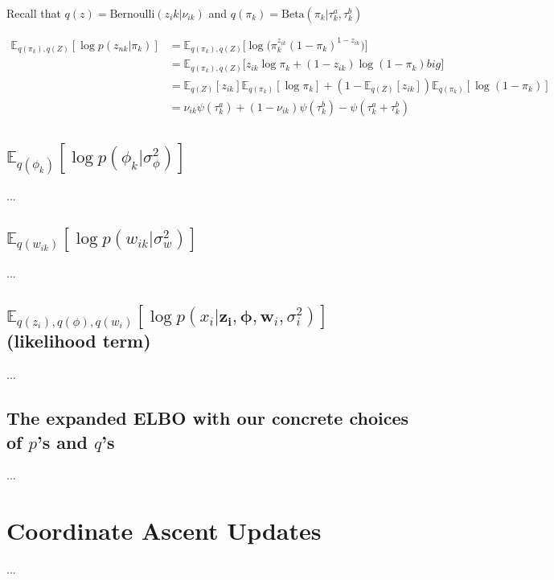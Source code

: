 \documentclass[11pt]{article}
\theoremstyle{definition}
\theoremstyle{plain}
\newcommand{\E}{\mathbb{E}}
\newcommand{\Beta}{\text{Beta}}
\newcommand{\Bernoulli}{\text{Bernoulli}}
\begin{document}
\noindent Recall that $q(z) = \Bernoulli(z_ik|\nu_{ik})$ and $q(\pi_k) = \Beta(\pi_k|\tau_k^a,\tau_k^b)$

\begin{align*}
    \E_{q(\pi_k),q(Z)}[\log p (z_{nk}|\pi_k)] 
        &= \E_{q(\pi_k),q(Z)}\big[\log \big(\pi_k^{z_{ik}}(1 - \pi_k)^{1 - z_{ik}}\big)\big]\\
        &= \E_{q(\pi_k),q(Z)}\big[ z_{ik} \log \pi_k + (1 - z_{ik})\log(1 - \pi_k) big]\\
        &= \E_{q(Z)}[z_{ik}] \E_{q(\pi_k)}[\log \pi_k] +  
            (1 - \E_{q(Z)}[z_{ik}]) \E_{q(\pi_k)}[\log(1 - \pi_k)]\\
        &= \nu_{ik} \psi(\tau_k^a) + (1 - \nu_{ik})\psi(\tau_k^b) - \psi(\tau_k^a + \tau_k^b)
\end{align*}






\subsection{$\E_{q(\phi_k)}[\log p(\phi_k|\sigma^2_\phi)]$}

...

\subsection{$\E_{q(w_{ik})}[ \log p(w_{ik}|\sigma^2_w)]$}

...

\subsection{$\E_{q(z_i),q(\phi),q(w_i)}[\log p(x_i | \mathbf{z_i}, \boldsymbol{\phi}, \mathbf{w}_i, \sigma^2_i)]$ (likelihood term)}

...

\subsection{The expanded ELBO with our concrete choices of $p$'s and $q$'s}

...

\section{Coordinate Ascent Updates}

...
\end{document}
